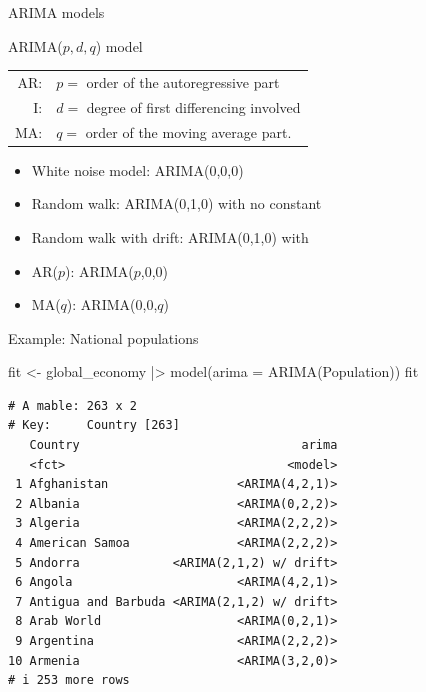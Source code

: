 \documentclass[
  14pt,
  ignorenonframetext,
  aspectratio=169,
]{beamer}
\newenvironment{Shaded}{\begin{snugshade}}{\end{snugshade}}
\newcommand{\AttributeTok}[1]{\textcolor[rgb]{0.77,0.63,0.00}{#1}}
\newcommand{\FunctionTok}[1]{\textcolor[rgb]{0.00,0.00,0.00}{#1}}
\newcommand{\NormalTok}[1]{\textcolor[rgb]{0.00,0.00,0.00}{#1}}
\newcommand{\OtherTok}[1]{\textcolor[rgb]{0.56,0.35,0.01}{#1}}
\newcommand{\SpecialCharTok}[1]{\textcolor[rgb]{0.00,0.00,0.00}{#1}}
\providecommand{\tightlist}{%
  \setlength{\itemsep}{0pt}\setlength{\parskip}{0pt}}\usepackage{longtable,booktabs,array}
\renewenvironment{Shaded}{\vspace*{0.15cm}\color{black}\fontsize{10}{10}\sf\begin{snugshade}\color{black}}{\end{snugshade}}
\begin{document}
\begin{frame}{ARIMA models}
\protect\hypertarget{arima-models-3}{}
\begin{block}{ARIMA($p, d, q$) model}
\begin{tabular}{rl}
AR:& $p =$ order of the autoregressive part\\
I: & $d =$ degree of first differencing involved\\
MA:& $q =$ order of the moving average part.
\end{tabular}
\end{block}

\begin{itemize}
\tightlist
\item
  White noise model: ARIMA(0,0,0)
\item
  Random walk: ARIMA(0,1,0) with no constant
\item
  Random walk with drift: ARIMA(0,1,0) with 
\item
  AR(\(p\)): ARIMA(\(p\),0,0)
\item
  MA(\(q\)): ARIMA(0,0,\(q\))
\end{itemize}
\end{frame}

\begin{frame}[fragile]{Example: National populations}
\protect\hypertarget{example-national-populations}{}
\fontsize{11}{12}\sf

\begin{Shaded}
\begin{Highlighting}[]
\NormalTok{fit }\OtherTok{\textless{}{-}}\NormalTok{ global\_economy }\SpecialCharTok{|\textgreater{}}
  \FunctionTok{model}\NormalTok{(}\AttributeTok{arima =} \FunctionTok{ARIMA}\NormalTok{(Population))}
\NormalTok{fit}
\end{Highlighting}
\end{Shaded}

\begin{verbatim}
# A mable: 263 x 2
# Key:     Country [263]
   Country                               arima
   <fct>                               <model>
 1 Afghanistan                  <ARIMA(4,2,1)>
 2 Albania                      <ARIMA(0,2,2)>
 3 Algeria                      <ARIMA(2,2,2)>
 4 American Samoa               <ARIMA(2,2,2)>
 5 Andorra             <ARIMA(2,1,2) w/ drift>
 6 Angola                       <ARIMA(4,2,1)>
 7 Antigua and Barbuda <ARIMA(2,1,2) w/ drift>
 8 Arab World                   <ARIMA(0,2,1)>
 9 Argentina                    <ARIMA(2,2,2)>
10 Armenia                      <ARIMA(3,2,0)>
# i 253 more rows
\end{verbatim}
\end{frame}
\end{document}
